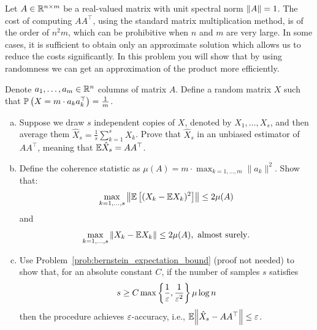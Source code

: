 \begin{myexercise}\label{prob:randomized_matrix_mult}
    Let $A \in \mathbb{R}^{n\times m}$ be a real-valued matrix with unit spectral norm ${\left\lVert{A}\right\rVert} = 1$. The cost of computing $AA^\top$, using the standard matrix multiplication method, is of the order of $n^2 m$, which can be prohibitive when $n$ and $m$ are very large. In some cases, it is sufficient to obtain only an approximate solution which allows us to reduce the costs significantly. In this problem you will show that by using randomness we can get an approximation of the product more efficiently.
    
    
    Denote $a_1, \dots, a_m \in \mathbb{R}^n$ columns of matrix $A$. Define a random matrix $X$ such that $\mathbb{P}\left( X = m \cdot a_k a_k^\top \right) = \frac{1}{m}$. 
    \begin{enumerate}[(a)]
        \item Suppose we draw $s$ independent copies of $X$, denoted by $X_1, \dots, X_s$, and then average them $\hat{X}_s = \frac{1}{s} \sum_{k=1}^s X_k$. Prove that $\hat{X}_s$ in an unbiased estimator of $A A^\top$, meaning that $\mathbb{E} \hat{X}_s = A A^\top$.
        
        \item Define the coherence statistic as $\mu(A) = m \cdot \displaystyle{\max_{k = 1, \dots, m} \|a_k\|^2} $. Show that:
        \begin{equation*}
            \max_{k = 1, \dots, s} {\left\lVert{\mathbb{E}\left[ (X_k - \mathbb{E}X_k)^2 \right]}\right\rVert}  \le 2 \mu(A)
        \end{equation*}
        and 
        \begin{equation*}
            \max_{k = 1, \dots, s} \|X_k - \mathbb{E} X_k \| \le 2\mu(A), \text{ almost surely}.
        \end{equation*}
        
        \item Use Problem~\ref{prob:bernstein_expectation_bound} (proof not needed) to show that, for an absolute constant $C$, if the number of samples $s$ satisfies
        \begin{equation*}
            s \ge C \max \left\{ \frac{1}{\varepsilon}, \frac{1}{\varepsilon^2}  \right\} \mu \log n
        \end{equation*}
        then the procedure achieves $\varepsilon$-accuracy, i.e., $\mathbb{E}{\left\lVert{\hat{X}_s - AA^\top}\right\rVert} \le \varepsilon$.
    \end{enumerate}
\end{myexercise}

